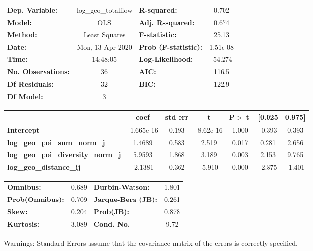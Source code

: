 \begin{center}
\begin{tabular}{lclc}
\toprule
\textbf{Dep. Variable:}                    & log\_geo\_totalflow & \textbf{  R-squared:         } &     0.702   \\
\textbf{Model:}                            &         OLS         & \textbf{  Adj. R-squared:    } &     0.674   \\
\textbf{Method:}                           &    Least Squares    & \textbf{  F-statistic:       } &     25.13   \\
\textbf{Date:}                             &   Mon, 13 Apr 2020  & \textbf{  Prob (F-statistic):} &  1.51e-08   \\
\textbf{Time:}                             &       14:48:05      & \textbf{  Log-Likelihood:    } &   -54.274   \\
\textbf{No. Observations:}                 &            36       & \textbf{  AIC:               } &     116.5   \\
\textbf{Df Residuals:}                     &            32       & \textbf{  BIC:               } &     122.9   \\
\textbf{Df Model:}                         &             3       & \textbf{                     } &             \\
\bottomrule
\end{tabular}
\begin{tabular}{lcccccc}
                                           & \textbf{coef} & \textbf{std err} & \textbf{t} & \textbf{P$> |$t$|$} & \textbf{[0.025} & \textbf{0.975]}  \\
\midrule
\textbf{Intercept}                         &   -1.665e-16  &        0.193     & -8.62e-16  &         1.000        &       -0.393    &        0.393     \\
\textbf{log\_geo\_poi\_sum\_norm\_j}       &       1.4689  &        0.583     &     2.519  &         0.017        &        0.281    &        2.656     \\
\textbf{log\_geo\_poi\_diversity\_norm\_j} &       5.9593  &        1.868     &     3.189  &         0.003        &        2.153    &        9.765     \\
\textbf{log\_geo\_distance\_ij}            &      -2.1381  &        0.362     &    -5.910  &         0.000        &       -2.875    &       -1.401     \\
\bottomrule
\end{tabular}
\begin{tabular}{lclc}
\textbf{Omnibus:}       &  0.689 & \textbf{  Durbin-Watson:     } &    1.801  \\
\textbf{Prob(Omnibus):} &  0.709 & \textbf{  Jarque-Bera (JB):  } &    0.261  \\
\textbf{Skew:}          &  0.204 & \textbf{  Prob(JB):          } &    0.878  \\
\textbf{Kurtosis:}      &  3.089 & \textbf{  Cond. No.          } &     9.72  \\
\bottomrule
\end{tabular}
\end{center}

Warnings: \newline
 [1] Standard Errors assume that the covariance matrix of the errors is correctly specified.